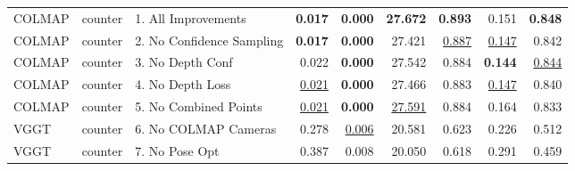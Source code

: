 \begin{table}[H]
\begin{tabular}{lllrrrrrr}
\midrule
COLMAP & counter & 1. All Improvements & \textbf{0.017} & \textbf{0.000} & \textbf{27.672} & \textbf{0.893} & 0.151 & \textbf{0.848} \\
COLMAP & counter & 2. No Confidence Sampling & \textbf{0.017} & \textbf{0.000} & 27.421 & \underline{0.887} & \underline{0.147} & 0.842 \\
COLMAP & counter & 3. No Depth Conf & 0.022 & \textbf{0.000} & 27.542 & 0.884 & \textbf{0.144} & \underline{0.844} \\
COLMAP & counter & 4. No Depth Loss & \underline{0.021} & \textbf{0.000} & 27.466 & 0.883 & \underline{0.147} & 0.840 \\
COLMAP & counter & 5. No Combined Points & \underline{0.021} & \textbf{0.000} & \underline{27.591} & 0.884 & 0.164 & 0.833 \\
VGGT & counter & 6. No COLMAP Cameras & 0.278 & \underline{0.006} & 20.581 & 0.623 & 0.226 & 0.512 \\
VGGT & counter & 7. No Pose Opt & 0.387 & 0.008 & 20.050 & 0.618 & 0.291 & 0.459 \\
\bottomrule
\end{tabular}
\end{table}